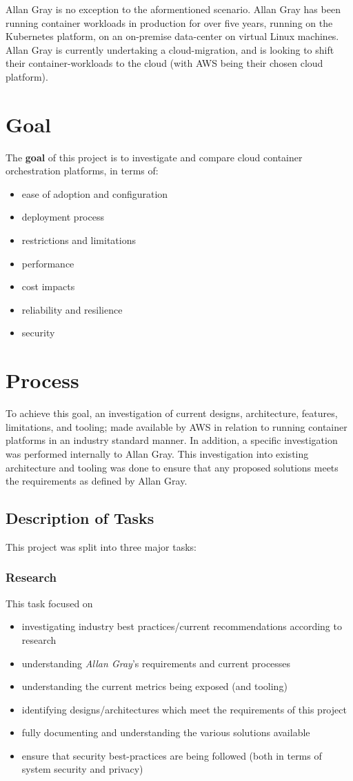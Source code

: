 \noindent Allan Gray is no exception to the aformentioned scenario. Allan Gray has been running container workloads in production for over five years,
running on the Kubernetes platform, on an on-premise data-center on virtual Linux machines.
Allan Gray is currently undertaking a cloud-migration, and is looking to shift their container-workloads to the cloud (with AWS being their chosen cloud platform).

\chapter{Goal}
\noindent The \textbf{goal} of this project is to investigate and compare cloud container orchestration platforms, in terms of:
\begin{itemize}
  \item ease of adoption and configuration
  \item deployment process
  \item restrictions and limitations
  \item performance
  \item cost impacts
  \item reliability and resilience
  \item security
\end{itemize}

\chapter{Process}
\noindent To achieve this goal, an investigation of current designs, architecture, features, limitations, and tooling; made available by AWS in relation
to running container platforms in an industry standard manner.
In addition, a specific investigation was performed internally to Allan Gray. This investigation into existing architecture and tooling was done to ensure
that any proposed solutions meets the requirements as defined by Allan Gray.

\section{Description of Tasks}
This project was split into three major tasks:
\subsection{Research}
This task focused on
\begin{itemize}
  \item investigating industry best practices/current recommendations according to research
  \item understanding \textit{Allan Gray}'s requirements and current processes
  \item understanding the current metrics being exposed (and tooling)
  \item identifying designs/architectures which meet the requirements of this project
  \item fully documenting and understanding the various solutions available
  \item ensure that security best-practices are being followed (both in terms of system security and privacy)
\end{itemize}
